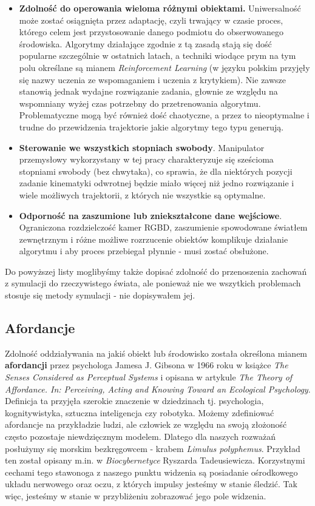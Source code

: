 \documentclass[12pt]{article}
\begin{document}
\begin{itemize}
\item \textbf{Zdolność do operowania wieloma różnymi obiektami.} Uniwersalność może zostać osiągnięta przez adaptację, czyli trwający w czasie proces, którego celem jest przystosowanie danego podmiotu do obserwowanego środowiska. Algorytmy działające zgodnie z tą zasadą stają się dość popularne szczególnie w ostatnich latach, a techniki wiodące prym na tym polu określane są mianem \emph{Reinforcement Learning} (w języku polskim przyjęły się nazwy uczenia ze wspomaganiem i uczenia z krytykiem). Nie zawsze stanowią jednak wydajne rozwiązanie zadania, głownie ze względu na wspomniany wyżej czas potrzebny do przetrenowania algorytmu. Problematyczne mogą być również dość chaotyczne, a przez to nieoptymalne i trudne do przewidzenia trajektorie jakie algorytmy tego typu generują.

\item \textbf{Sterowanie we wszystkich stopniach swobody}. Manipulator przemysłowy wykorzystany w tej pracy charakteryzuje się sześcioma stopniami swobody (bez chwytaka), co sprawia, że dla niektórych pozycji zadanie kinematyki odwrotnej będzie miało więcej niż jedno rozwiązanie i wiele możliwych trajektorii, z których nie wszystkie są optymalne.

\item \textbf{Odporność na zaszumione lub zniekształcone dane wejściowe}. Ograniczona rozdzielczość kamer RGBD, zaszumienie spowodowane światłem zewnętrznym i różne możliwe rozrzucenie obiektów komplikuje działanie algorytmu i aby proces przebiegał płynnie - musi zostać obsłużone.
\end{itemize}

Do powyższej listy moglibyśmy także dopisać zdolność do przenoszenia zachowań z symulacji do rzeczywistego świata, ale ponieważ nie we wszytkich problemach stosuje się metody symulacji - nie dopisywałem jej.

\subsection{Afordancje}
Zdolność oddziaływania na jakiś obiekt lub środowisko została określona mianem \textbf{afordancji} przez psychologa Jamesa J. Gibsona w 1966 roku w książce \emph{The Senses Considered as Perceptual Systems} i opisana w artykule \emph{The  Theory  of  Affordance.  In:  Perceiving,  Acting  and  Knowing  Toward  an Ecological Psychology}. Definicja ta przyjęła szerokie znaczenie w dziedzinach tj. psychologia, kognitywistyka, sztuczna inteligencja czy robotyka. Możemy zdefiniować afordancje na przykładzie ludzi, ale człowiek ze względu na swoją złożoność często pozostaje niewdzięcznym modelem. Dlatego dla naszych rozważań posłużymy się morskim bezkręgowcem - krabem \emph{Limulus polyphemus}. Przykład ten został opisany m.in. w \emph{Biocybernetyce} Ryszarda Tadeusiewicza. Korzystnymi cechami tego stawonoga z naszego punktu widzenia są posiadanie ośrodkowego układu nerwowego oraz oczu, z których impulsy jesteśmy w stanie śledzić. Tak więc, jesteśmy w stanie w przybliżeniu zobrazować jego pole widzenia. 
\end{document}
